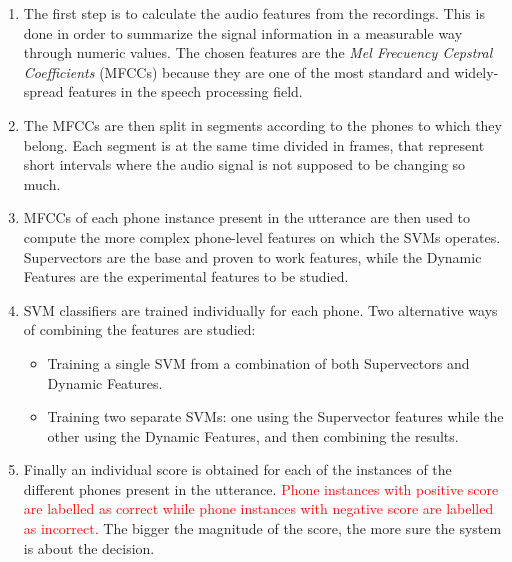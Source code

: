 \begin{enumerate}

 \item The first step is to calculate the audio features from the recordings.
 This is done in order to summarize the signal information
 in a measurable way through numeric values. The chosen features
 are the \textit{Mel Frecuency Cepstral Coefficients} (MFCCs) because they are one of the
 most standard and widely-spread features in the speech processing field.

 \item The MFCCs are then split in segments according to the phones to which they
 belong. Each segment is at the same time divided in frames, that represent short
 intervals where the audio signal is not supposed to be changing so much.

 \item MFCCs of each phone instance present in the utterance
 are then used to compute the more complex phone-level features
 on which the SVMs operates. Supervectors are the base and proven to work features,
 while the Dynamic Features are the experimental features to be studied.

 \item {
  SVM classifiers are trained individually for each phone. Two alternative ways of combining the
  features are studied:
    \begin{itemize}
      \item Training a single SVM from a combination of both Supervectors and Dynamic Features.
      \item Training two separate SVMs: one using the Supervector features while the other using the
      Dynamic Features, and then combining the results.
    \end{itemize}
 }

 \item Finally an individual score is obtained for each of the instances
 of the different phones present in the
 utterance. \textcolor{red}{Phone instances with positive score are labelled as
 correct while phone instances with negative score are labelled as incorrect.}
 The bigger the magnitude of the score, the more sure the system is about the
 decision.

\end{enumerate}

